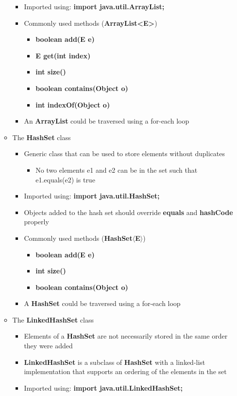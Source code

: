 \documentclass[11pt]{article}
\begin{document}
\begin{itemize}
\begin{itemize}
\begin{itemize}
					\item Imported using: \textbf{import java.util.ArrayList;}
					\item Commonly used methods (\textbf{ArrayList<E>})
						\begin{itemize}
							\item \textbf{boolean add(E e)}
							\item \textbf{E get(int index)}
							\item \textbf{int size()}
							\item \textbf{boolean contains(Object o)}
							\item \textbf{int indexOf(Object o)}
						\end{itemize}
					\item An \textbf{ArrayList} could be traversed using a for-each loop
				\end{itemize}
			\newpage
			\item The \textbf{HashSet} class
				\begin{itemize}
					\item Generic class that can be used to store elements without duplicates
						\begin{itemize}
							\item No two elements e1 and e2 can be in the set such that e1.equals(e2) is true
						\end{itemize}
					\item Imported using: \textbf{import java.util.HashSet;}
					\item Objects added to the hash set should override \textbf{equals} and \textbf{hashCode} properly
					\item Commonly used methods (\textbf{HashSet$\langle$E$\rangle$})
						\begin{itemize}
							\item \textbf{boolean add(E e)}
							\item \textbf{int size()}
							\item \textbf{boolean contains(Object o)}
						\end{itemize}
					\item A \textbf{HashSet} could be traversed using a for-each loop
				\end{itemize}

			\item The \textbf{LinkedHashSet} class
				\begin{itemize}
					\item Elements of a \textbf{HashSet} are not necessarily stored in the same
					order they were added
					\item \textbf{LinkedHashSet} is a subclass of \textbf{HashSet} with a linked-list implementation that supports an ordering of the elements in the set
					\item Imported using: \textbf{import java.util.LinkedHashSet;}
				\end{itemize}
		\end{itemize}


\end{itemize}
\end{document}
